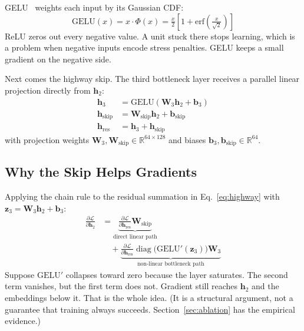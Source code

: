 \documentclass[conference,10pt,letterpaper]{IEEEtran}
\begin{document}
GELU~\cite{hendrycks2016gaussian} weights each input by its Gaussian CDF:
\begin{equation}
\text{GELU}(x) = x \cdot \Phi(x) = \tfrac{x}{2}\left[1 + \text{erf}\!\left(\tfrac{x}{\sqrt{2}}\right)\right]
\end{equation}
ReLU zeros out every negative value. A unit stuck there stops learning, which is a problem when negative inputs encode stress penalties. GELU keeps a small gradient on the negative side.

Next comes the highway skip. The third bottleneck layer receives a parallel linear projection directly from $\mathbf{h}_2$:
\begin{align}
\mathbf{h}_3 &= \text{GELU}(\mathbf{W}_3 \mathbf{h}_2 + \mathbf{b}_3) \\
\mathbf{h}_{\text{skip}} &= \mathbf{W}_{\text{skip}} \mathbf{h}_2 + \mathbf{b}_{\text{skip}} \\
\mathbf{h}_{\text{res}} &= \mathbf{h}_3 + \mathbf{h}_{\text{skip}} \label{eq:highway}
\end{align}
with projection weights $\mathbf{W}_3, \mathbf{W}_{\text{skip}} \in \mathbb{R}^{64 \times 128}$ and biases $\mathbf{b}_3, \mathbf{b}_{\text{skip}} \in \mathbb{R}^{64}$.

\subsection{Why the Skip Helps Gradients}
Applying the chain rule to the residual summation in Eq.~\eqref{eq:highway} with $\mathbf{z}_3 = \mathbf{W}_3 \mathbf{h}_2 + \mathbf{b}_3$:
\begin{equation}
\begin{aligned}
\frac{\partial \mathcal{L}}{\partial \mathbf{h}_2}
&= \underbrace{\frac{\partial \mathcal{L}}{\partial \mathbf{h}_{\text{res}}} \mathbf{W}_{\text{skip}}}_{\text{direct linear path}} \\
&\quad + \underbrace{\frac{\partial \mathcal{L}}{\partial \mathbf{h}_{\text{res}}} \operatorname{diag}\!\big(\text{GELU}'(\mathbf{z}_3)\big)\mathbf{W}_3}_{\text{non-linear bottleneck path}}
\end{aligned}
\end{equation}
Suppose $\text{GELU}'$ collapses toward zero because the layer saturates. The second term vanishes, but the first term does not. Gradient still reaches $\mathbf{h}_2$ and the embeddings below it. That is the whole idea. (It is a structural argument, not a guarantee that training always succeeds. Section~\ref{sec:ablation} has the empirical evidence.)
\end{document}
